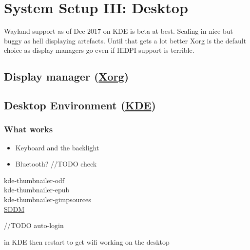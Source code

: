 
\section{System Setup III: Desktop}

Wayland support as of Dec 2017 on KDE is beta at best. Scaling in nice but buggy as hell displaying artefacts. Until that gets a lot better Xorg is the default choice as display managers go even if HiDPI support is terrible. 

\subsection{Display manager (\href{https://wiki.archlinux.org/index.php/xorg}{Xorg})}


\subsection{Desktop Environment (\href{https://wiki.archlinux.org/index.php/KDE}{KDE})}

\subsubsection{What works}

\begin{itemize}[noitemsep,topsep=0pt,leftmargin=*]
    \item Keyboard and the backlight
    \item Bluetooth? //TODO check
\end{itemize}


kde-thumbnailer-odf\\
kde-thumbnailer-epub\\
kde-thumbnailer-gimpsources\\


\href{https://wiki.archlinux.org/index.php/SDDM}{SDDM}

//TODO auto-login

 in KDE then restart to get wifi working on the desktop


